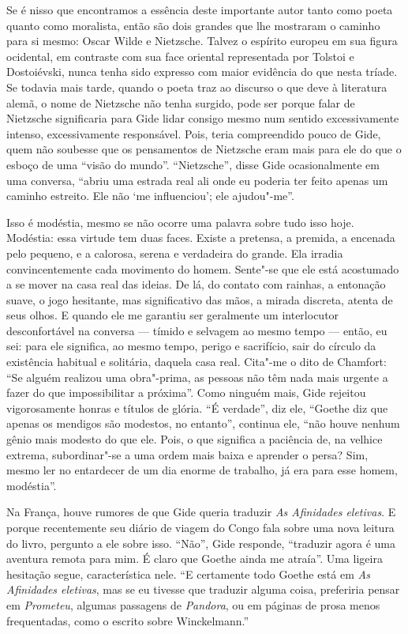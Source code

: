 Se é nisso que encontramos a essência deste importante autor tanto como
poeta quanto como moralista, então são dois grandes que lhe mostraram o
caminho para si mesmo: Oscar Wilde e Nietzsche. Talvez o espírito
europeu em sua figura ocidental, em contraste com sua face oriental
representada por Tolstoi e Dostoiévski, nunca tenha sido expresso com
maior evidência do que nesta tríade. Se todavia mais tarde, quando o
poeta traz ao discurso o que deve à literatura alemã, o nome de
Nietzsche não tenha surgido, pode ser porque falar de Nietzsche
significaria para Gide lidar consigo mesmo num sentido excessivamente
intenso, excessivamente responsável. Pois, teria compreendido pouco de
Gide, quem não soubesse que os pensamentos de Nietzsche eram mais para
ele do que o esboço de uma ``visão do mundo''. ``Nietzsche'', disse Gide
ocasionalmente em uma conversa, ``abriu uma estrada real ali onde eu
poderia ter feito apenas um caminho estreito. Ele não `me influenciou';
ele ajudou"-me''.

Isso é modéstia, mesmo se não ocorre uma palavra sobre tudo isso hoje.
Modéstia: essa virtude tem duas faces. Existe a pretensa, a premida, a
encenada pelo pequeno, e a calorosa, serena e verdadeira do grande. Ela
irradia convincentemente cada movimento do homem. Sente"-se que ele está
acostumado a se mover na casa real das ideias. De lá, do contato com
rainhas, a entonação suave, o jogo hesitante, mas significativo das
mãos, a mirada discreta, atenta de seus olhos. E quando ele me garantiu
ser geralmente um interlocutor desconfortável na conversa --- tímido e
selvagem ao mesmo tempo --- então, eu sei: para ele significa, ao mesmo
tempo, perigo e sacrifício, sair do círculo da existência habitual e
solitária, daquela casa real. Cita"-me o dito de Chamfort: ``Se alguém
realizou uma obra"-prima, as pessoas não têm nada mais urgente a fazer do
que impossibilitar a próxima''. Como ninguém mais, Gide rejeitou
vigorosamente honras e títulos de glória. ``É verdade'', diz ele,
``Goethe diz que apenas os mendigos são modestos, no entanto'', continua
ele, ``não houve nenhum gênio mais modesto do que ele. Pois, o que
significa a paciência de, na velhice extrema, subordinar"-se a uma ordem
mais baixa e aprender o persa? Sim, mesmo ler no entardecer de um dia
enorme de trabalho, já era para esse homem, modéstia''.

Na França, houve rumores de que Gide queria traduzir \emph{As Afinidades
eletivas}. E porque recentemente seu diário de viagem do Congo fala
sobre uma nova leitura do livro, pergunto a ele sobre isso. ``Não'',
Gide responde, ``traduzir agora é uma aventura remota para mim. É claro
que Goethe ainda me atraía''. Uma ligeira hesitação segue, característica
nele. ``E certamente todo Goethe está em \emph{As} \emph{Afinidades
eletivas}, mas se eu tivesse que traduzir alguma coisa, preferiria
pensar em \emph{Prometeu}, algumas passagens de \emph{Pandora}, ou em
páginas de prosa menos frequentadas, como o escrito sobre Winckelmann.''

